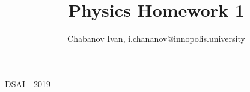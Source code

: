 

\begin{titlepage}
    \title{Physics Homework 1}
    \author{Chabanov Ivan, i.chananov@innopolis.university}
    \maketitle
    DSAI - 2019


\end{titlepage}